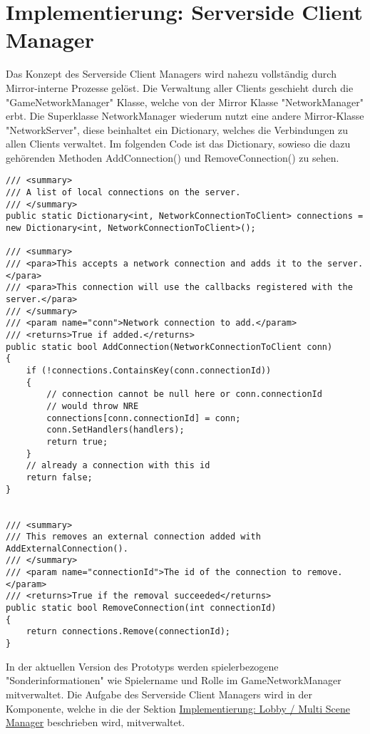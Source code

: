 \section{Implementierung: Serverside Client Manager}

Das Konzept des Serverside Client Managers wird nahezu vollständig durch Mirror-interne Prozesse gelöst. Die Verwaltung aller Clients geschieht durch die "GameNetworkManager" Klasse, welche von der Mirror Klasse "NetworkManager" erbt. Die Superklasse NetworkManager wiederum nutzt eine andere Mirror-Klasse "NetworkServer", diese beinhaltet ein Dictionary, welches die Verbindungen zu allen Clients verwaltet. Im folgenden Code ist das Dictionary, sowieso die dazu gehörenden Methoden AddConnection() und RemoveConnection() zu sehen.

\begin{lstlisting}[caption= Mirror Class NetworkServer.cs Connection Handling]
/// <summary>
/// A list of local connections on the server.
/// </summary>
public static Dictionary<int, NetworkConnectionToClient> connections = new Dictionary<int, NetworkConnectionToClient>();

/// <summary>
/// <para>This accepts a network connection and adds it to the server.</para>
/// <para>This connection will use the callbacks registered with the server.</para>
/// </summary>
/// <param name="conn">Network connection to add.</param>
/// <returns>True if added.</returns>
public static bool AddConnection(NetworkConnectionToClient conn)
{
	if (!connections.ContainsKey(conn.connectionId))
	{
		// connection cannot be null here or conn.connectionId
		// would throw NRE
		connections[conn.connectionId] = conn;
		conn.SetHandlers(handlers);
		return true;
	}
	// already a connection with this id
	return false;
}


/// <summary>
/// This removes an external connection added with AddExternalConnection().
/// </summary>
/// <param name="connectionId">The id of the connection to remove.</param>
/// <returns>True if the removal succeeded</returns>
public static bool RemoveConnection(int connectionId)
{
	return connections.Remove(connectionId);
}
\end{lstlisting}

In der aktuellen Version des Prototyps werden spielerbezogene "Sonderinformationen" wie Spielername und Rolle im GameNetworkManager  mitverwaltet. Die Aufgabe des Serverside Client Managers wird in der Komponente, welche in die der Sektion \hyperref[Lobby Manager Implementierung]{Implementierung: Lobby / Multi Scene Manager} beschrieben wird, mitverwaltet. 

